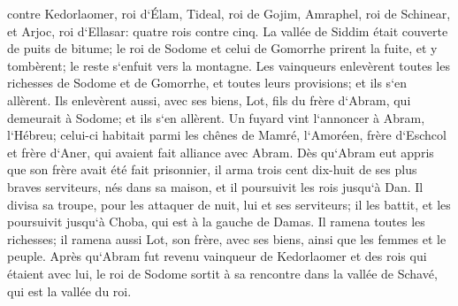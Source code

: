 \verse contre Kedorlaomer, roi d`Élam, Tideal, roi de Gojim, Amraphel, roi de Schinear, et Arjoc, roi d`Ellasar: quatre rois contre cinq. 
\verse La vallée de Siddim était couverte de puits de bitume; le roi de Sodome et celui de Gomorrhe prirent la fuite, et y tombèrent; le reste s`enfuit vers la montagne. 
\verse Les vainqueurs enlevèrent toutes les richesses de Sodome et de Gomorrhe, et toutes leurs provisions; et ils s`en allèrent. 
\verse Ils enlevèrent aussi, avec ses biens, Lot, fils du frère d`Abram, qui demeurait à Sodome; et ils s`en allèrent. 
\verse Un fuyard vint l`annoncer à Abram, l`Hébreu; celui-ci habitait parmi les chênes de Mamré, l`Amoréen, frère d`Eschcol et frère d`Aner, qui avaient fait alliance avec Abram. 
\verse Dès qu`Abram eut appris que son frère avait été fait prisonnier, il arma trois cent dix-huit de ses plus braves serviteurs, nés dans sa maison, et il poursuivit les rois jusqu`à Dan. 
\verse Il divisa sa troupe, pour les attaquer de nuit, lui et ses serviteurs; il les battit, et les poursuivit jusqu`à Choba, qui est à la gauche de Damas. 
\verse Il ramena toutes les richesses; il ramena aussi Lot, son frère, avec ses biens, ainsi que les femmes et le peuple. 
\verse Après qu`Abram fut revenu vainqueur de Kedorlaomer et des rois qui étaient avec lui, le roi de Sodome sortit à sa rencontre dans la vallée de Schavé, qui est la vallée du roi. 
